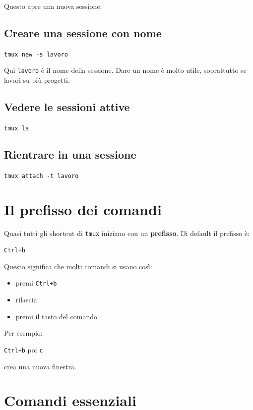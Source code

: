 \documentclass[a4paper,11pt]{article}
\begin{document}
Questo apre una nuova sessione.

\subsection{Creare una sessione con nome}
\begin{codebox}
\texttt{tmux new -s lavoro}
\end{codebox}

Qui \texttt{lavoro} è il nome della sessione. Dare un nome è molto utile, soprattutto se lavori su più progetti.

\subsection{Vedere le sessioni attive}
\begin{codebox}
\texttt{tmux ls}
\end{codebox}

\subsection{Rientrare in una sessione}
\begin{codebox}
\texttt{tmux attach -t lavoro}
\end{codebox}

\section{Il prefisso dei comandi}
Quasi tutti gli shortcut di \texttt{tmux} iniziano con un \textbf{prefisso}. Di default il prefisso è:

\begin{center}
\Large \texttt{Ctrl+b}
\end{center}

Questo significa che molti comandi si usano così:
\begin{itemize}[leftmargin=1.2cm]
    \item premi \texttt{Ctrl+b}
    \item rilascia
    \item premi il tasto del comando
\end{itemize}

Per esempio:
\begin{codebox}
\texttt{Ctrl+b} poi \texttt{c}
\end{codebox}
crea una nuova finestra.

\section{Comandi essenziali}
\end{document}
